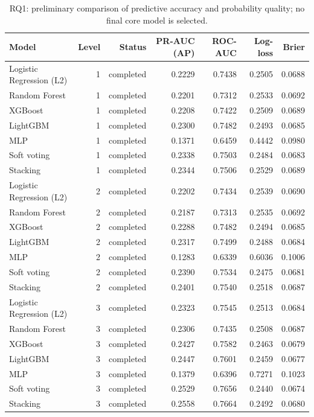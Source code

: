 \begin{table}[htbp]
\centering
\small
\caption{RQ1: preliminary comparison of predictive accuracy and probability quality; no final core model is selected.}
\label{tab:pilot-rq1-model-comparison}
\begin{tabular}{lrrrrrr}
\toprule
Model & Level & Status & PR-AUC (AP) & ROC-AUC & Log-loss & Brier \\
\midrule
Logistic Regression (L2) & 1 & completed & 0.2229 & 0.7438 & 0.2505 & 0.0688 \\
Random Forest & 1 & completed & 0.2201 & 0.7312 & 0.2533 & 0.0692 \\
XGBoost & 1 & completed & 0.2208 & 0.7422 & 0.2509 & 0.0689 \\
LightGBM & 1 & completed & 0.2300 & 0.7482 & 0.2493 & 0.0685 \\
MLP & 1 & completed & 0.1371 & 0.6459 & 0.4442 & 0.0980 \\
Soft voting & 1 & completed & 0.2338 & 0.7503 & 0.2484 & 0.0683 \\
Stacking & 1 & completed & 0.2344 & 0.7506 & 0.2529 & 0.0689 \\
Logistic Regression (L2) & 2 & completed & 0.2202 & 0.7434 & 0.2539 & 0.0690 \\
Random Forest & 2 & completed & 0.2187 & 0.7313 & 0.2535 & 0.0692 \\
XGBoost & 2 & completed & 0.2288 & 0.7482 & 0.2494 & 0.0685 \\
LightGBM & 2 & completed & 0.2317 & 0.7499 & 0.2488 & 0.0684 \\
MLP & 2 & completed & 0.1283 & 0.6339 & 0.6036 & 0.1006 \\
Soft voting & 2 & completed & 0.2390 & 0.7534 & 0.2475 & 0.0681 \\
Stacking & 2 & completed & 0.2401 & 0.7540 & 0.2518 & 0.0687 \\
Logistic Regression (L2) & 3 & completed & 0.2323 & 0.7545 & 0.2513 & 0.0684 \\
Random Forest & 3 & completed & 0.2306 & 0.7435 & 0.2508 & 0.0687 \\
XGBoost & 3 & completed & 0.2427 & 0.7582 & 0.2463 & 0.0679 \\
LightGBM & 3 & completed & 0.2447 & 0.7601 & 0.2459 & 0.0677 \\
MLP & 3 & completed & 0.1379 & 0.6396 & 0.7271 & 0.1023 \\
Soft voting & 3 & completed & 0.2529 & 0.7656 & 0.2440 & 0.0674 \\
Stacking & 3 & completed & 0.2558 & 0.7664 & 0.2492 & 0.0680 \\

\end{tabular}
\end{table}
